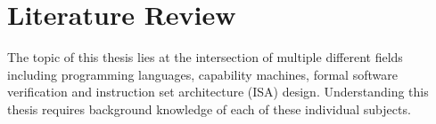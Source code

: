 \chapter{Literature Review}
\label{cha:litrev}
The topic of this thesis lies at the intersection of multiple different fields including programming languages, capability machines, formal software verification and instruction set architecture (ISA) design. Understanding this thesis requires background knowledge of each of these individual subjects.


%
%
%

